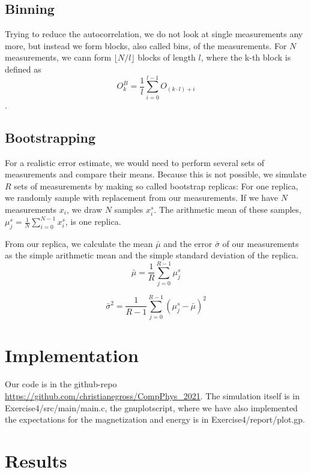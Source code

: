 \documentclass{scrartcl}
\begin{document}
\subsection{Binning}

Trying to reduce the autocorrelation, we do not look at single measurements any more, but instead we form blocks, also called bins, of the measurements. For $N$ measurements, we cann form $\lfloor N/l \rfloor$ blocks of length $l$, where the k-th block is defined as \[O_k^B=\frac{1}{l}\sum_{i=0}^{l-1}O_{(k\cdot l)+i}\].

\subsection{Bootstrapping}


For a realistic error estimate, we would need to perform several sets of measurements and compare their means. Because this is not possible, we simulate $R$ sets of measurements by making so called bootstrap replicas: For one replica, we randomly sample with replacement from our measurements. If we have $N$ measurements $x_i$, we draw $N$ samples $x_i^s$. The arithmetic mean of these samples, $\mu^s_j=\frac{1}{N}\sum_{i=0}^{N-1}x_i^s$, is one replica.

From our replica, we calculate the mean $\bar{\mu}$ and the error $\bar{\sigma}$ of our measurements as the simple arithmetic mean and the simple standard deviation of the replica.
\[
\bar{\mu}=\frac{1}{R}\sum_{j=0}^{R-1}\mu^s_j\]


\[
\bar{\sigma}^2=\frac{1}{R-1}\sum_{j=0}^{R-1}(\mu^s_j-\bar{\mu})^2
\]

\section{Implementation}
Our code is in the github-repo \url{https://github.com/christianegross/CompPhys\_2021}. The simulation itself is in Exercise4/src/main/main.c, the gnuplotscript, where we have also implemented the expectations for the magnetization and energy is in Exercise4/report/plot.gp.

\section{Results}
\end{document}
